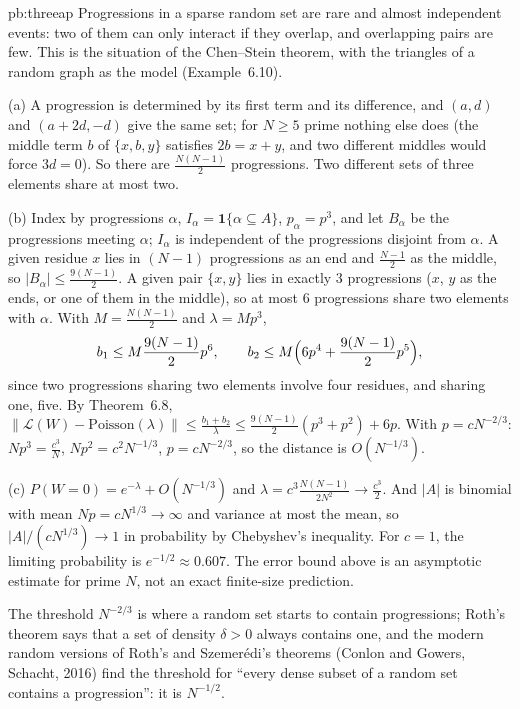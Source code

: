 \begin{solution}{pb:threeap}
\idea Progressions in a sparse random set are rare and almost independent events: two of them can only interact if they overlap, and overlapping pairs are few.
This is the situation of the Chen--Stein theorem, with the triangles of a random graph as the model (Example~6.10).

\writeup (a) A progression is determined by its first term and its difference, and $(a,d)$ and $(a+2d,-d)$ give the same set; for $N\ge5$ prime nothing else
does (the middle term $b$ of $\{x,b,y\}$ satisfies $2b=x+y$, and two different middles would force $3d=0$). So there are $\frac{N(N-1)}2$ progressions. Two different
sets of three elements share at most two.

(b) Index by progressions $\alpha$, $I_\alpha=\mathbf 1\{\alpha\subseteq A\}$, $p_\alpha=p^3$, and let $B_\alpha$ be the progressions meeting $\alpha$; $I_\alpha$ is independent of
the progressions disjoint from $\alpha$. A given residue $x$ lies in $(N-1)$ progressions as an end and $\frac{N-1}2$ as the middle, so $|B_\alpha|\le\frac{9(N-1)}2$. A given pair
$\{x,y\}$ lies in exactly $3$ progressions ($x$, $y$ as the ends, or one of them in the middle), so at most $6$ progressions share two elements with $\alpha$. With
$M=\frac{N(N-1)}2$ and $\lambda=Mp^3$,
\[
b_1\le M\frac{9(N-1)}2p^6,\qquad b_2\le M\Bigl(6p^4+\frac{9(N-1)}2p^5\Bigr),
\]
since two progressions sharing two elements involve four residues, and sharing one, five. By Theorem~6.8,
$\|\mathcal L(W)-\text{Poisson}(\lambda)\|\le\frac{b_1+b_2}\lambda\le\frac{9(N-1)}2(p^3+p^2)+6p$. With $p=cN^{-2/3}$: $Np^3=\frac{c^3}N$, $Np^2=c^2N^{-1/3}$, $p=cN^{-2/3}$, so the
distance is $O(N^{-1/3})$.

(c) $P(W=0)=e^{-\lambda}+O(N^{-1/3})$ and $\lambda=c^3\frac{N(N-1)}{2N^2}\to\frac{c^3}2$. And $|A|$ is binomial with mean $Np=cN^{1/3}\to\infty$ and variance at most the mean,
so $|A|/(cN^{1/3})\to1$ in probability by Chebyshev's inequality. For $c=1$, the limiting probability is $e^{-1/2}\approx0.607$. The error bound above is an asymptotic estimate for prime $N$, not an exact finite-size prediction.

\leads The threshold $N^{-2/3}$ is where a random set starts to contain progressions; Roth's theorem says that a set of density $\delta>0$ always contains one, and the
modern random versions of Roth's and Szemerédi's theorems (Conlon and Gowers, Schacht, 2016) find the threshold for ``every dense subset of a random set contains a
progression'': it is $N^{-1/2}$.
\end{solution}

